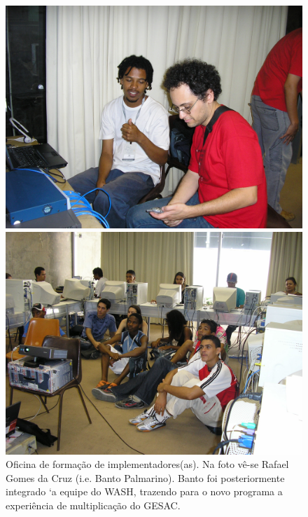 \documentclass[
12pt,		%
openright,	%
twoside,  %
a4paper,			%
chapter=TITLE,		%
english,			%
french,				%
spanish,			%
brazil				%
]{USPSC-classe/USPSC}
\begin{document}
\begin{figure}[max size={\textwidth}{\textheight}]
\begin{minipage}[b]{0.4\linewidth}
        \centering
                \includegraphics[width=1.0\linewidth]{../../imagens/bantorafa.JPG}
                \caption{Oficina de forma\c{c}\~ao de implementadores(as). Na foto v\^e-se Rafael Gomes da Cruz (i.e. Banto Palmarino). Banto foi posteriormente integrado `a equipe do WASH, trazendo para o novo programa a experi\^encia de multiplica\c{c}\~ao do GESAC.}
                \label{d2d74ac61c1b95a746858e8420d24348e1b48f51}
\end{minipage}%
\hspace{0.5cm}
\begin{minipage}[b]{0.4\linewidth}
        \centering
                \includegraphics[width=1.0\linewidth]{../../imagens/oficinalac.JPG}

\end{minipage}
\end{figure}
\end{document}
